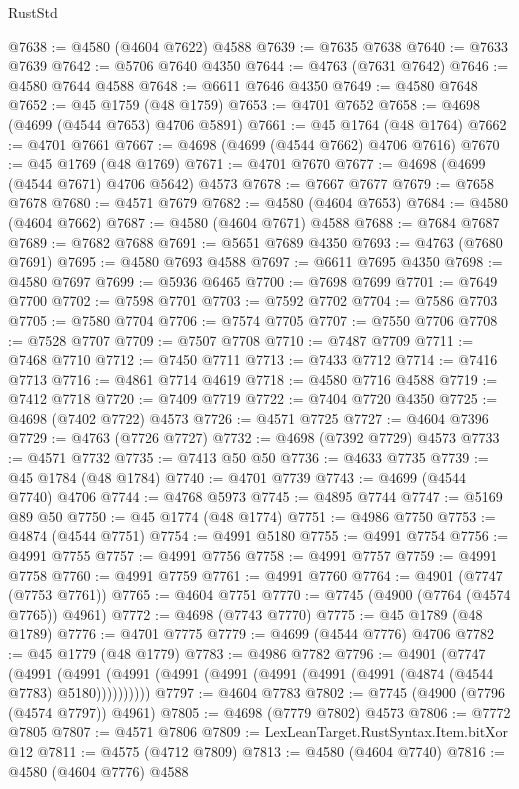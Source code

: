 \begin{lexlean}{RustStd}
\begin{coremodule}
@7638 := @4580 (@4604 @7622) @4588
@7639 := @7635 @7638
@7640 := @7633 @7639
@7642 := @5706 @7640 @4350
@7644 := @4763 (@7631 @7642)
@7646 := @4580 @7644 @4588
@7648 := @6611 @7646 @4350
@7649 := @4580 @7648
@7652 := @45 @1759 (@48 @1759)
@7653 := @4701 @7652
@7658 := @4698 (@4699 (@4544 @7653) @4706 @5891)
@7661 := @45 @1764 (@48 @1764)
@7662 := @4701 @7661
@7667 := @4698 (@4699 (@4544 @7662) @4706 @7616)
@7670 := @45 @1769 (@48 @1769)
@7671 := @4701 @7670
@7677 := @4698 (@4699 (@4544 @7671) @4706 @5642) @4573
@7678 := @7667 @7677
@7679 := @7658 @7678
@7680 := @4571 @7679
@7682 := @4580 (@4604 @7653)
@7684 := @4580 (@4604 @7662)
@7687 := @4580 (@4604 @7671) @4588
@7688 := @7684 @7687
@7689 := @7682 @7688
@7691 := @5651 @7689 @4350
@7693 := @4763 (@7680 @7691)
@7695 := @4580 @7693 @4588
@7697 := @6611 @7695 @4350
@7698 := @4580 @7697
@7699 := @5936 @6465
@7700 := @7698 @7699
@7701 := @7649 @7700
@7702 := @7598 @7701
@7703 := @7592 @7702
@7704 := @7586 @7703
@7705 := @7580 @7704
@7706 := @7574 @7705
@7707 := @7550 @7706
@7708 := @7528 @7707
@7709 := @7507 @7708
@7710 := @7487 @7709
@7711 := @7468 @7710
@7712 := @7450 @7711
@7713 := @7433 @7712
@7714 := @7416 @7713
@7716 := @4861 @7714 @4619
@7718 := @4580 @7716 @4588
@7719 := @7412 @7718
@7720 := @7409 @7719
@7722 := @7404 @7720 @4350
@7725 := @4698 (@7402 @7722) @4573
@7726 := @4571 @7725
@7727 := @4604 @7396
@7729 := @4763 (@7726 @7727)
@7732 := @4698 (@7392 @7729) @4573
@7733 := @4571 @7732
@7735 := @7413 @50 @50
@7736 := @4633 @7735
@7739 := @45 @1784 (@48 @1784)
@7740 := @4701 @7739
@7743 := @4699 (@4544 @7740) @4706
@7744 := @4768 @5973
@7745 := @4895 @7744
@7747 := @5169 @89 @50
@7750 := @45 @1774 (@48 @1774)
@7751 := @4986 @7750
@7753 := @4874 (@4544 @7751)
@7754 := @4991 @5180
@7755 := @4991 @7754
@7756 := @4991 @7755
@7757 := @4991 @7756
@7758 := @4991 @7757
@7759 := @4991 @7758
@7760 := @4991 @7759
@7761 := @4991 @7760
@7764 := @4901 (@7747 (@7753 @7761))
@7765 := @4604 @7751
@7770 := @7745 (@4900 (@7764 (@4574 @7765)) @4961)
@7772 := @4698 (@7743 @7770)
@7775 := @45 @1789 (@48 @1789)
@7776 := @4701 @7775
@7779 := @4699 (@4544 @7776) @4706
@7782 := @45 @1779 (@48 @1779)
@7783 := @4986 @7782
@7796 := @4901
    (@7747
      (@4991 (@4991 (@4991 (@4991 (@4991 (@4991 (@4991 (@4991 (@4874 (@4544 @7783) @5180))))))))))
@7797 := @4604 @7783
@7802 := @7745 (@4900 (@7796 (@4574 @7797)) @4961)
@7805 := @4698 (@7779 @7802) @4573
@7806 := @7772 @7805
@7807 := @4571 @7806
@7809 := LexLeanTarget.RustSyntax.Item.bitXor @12
@7811 := @4575 (@4712 @7809)
@7813 := @4580 (@4604 @7740)
@7816 := @4580 (@4604 @7776) @4588

\end{coremodule}
\end{lexlean}
